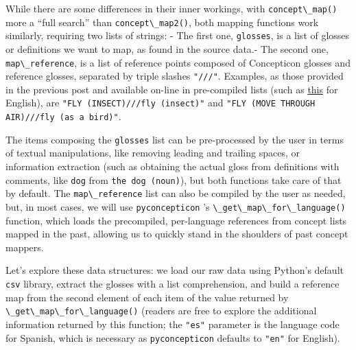 \documentclass[
  a4paper,
  14pt,
  oneside,
  tablecaptionabove
]{scrbook}
\newcommand{\passthrough}[1]{#1}
\begin{document}
While there are some differences in their inner workings, with
\passthrough{\lstinline!concept\_map()!} more a \enquote{full search}
than \passthrough{\lstinline!concept\_map2()!}, both mapping functions
work similarly, requiring two lists of strings: - The first one,
\passthrough{\lstinline!glosses!}, is a list of glosses or definitions
we want to map, as found in the source data.- The second one,
\passthrough{\lstinline!map\_reference!}, is a list of reference points
composed of Concepticon glosses and reference glosses, separated by
triple slashes \passthrough{\lstinline!"///"!}. Examples, as those
provided in the previous post and available on-line in pre-compiled
lists (such as
\href{https://github.com/concepticon/pyconcepticon/blob/master/tests/fixtures/mappings/map-en.tsv}{this}
for English), are
\passthrough{\lstinline!"FLY (INSECT)///fly (insect)"!} and
\passthrough{\lstinline!"FLY (MOVE THROUGH AIR)///fly (as a bird)"!}.

The items composing the \passthrough{\lstinline!glosses!} list can be
pre-processed by the user in terms of textual manipulations, like
removing leading and trailing spaces, or information extraction (such as
obtaining the actual gloss from definitions with comments, like
\passthrough{\lstinline!dog!} from
\passthrough{\lstinline!the dog (noun)!}), but both functions take care
of that by default. The \passthrough{\lstinline!map\_reference!} list
can also be compiled by the user as needed, but, in most cases, we will
use \passthrough{\lstinline!pyconcepticon!} 's
\passthrough{\lstinline!\_get\_map\_for\_language()!} function, which
loads the precompiled, per-language references from concept lists mapped
in the past, allowing us to quickly stand in the shoulders of past
concept mappers.

Let's explore these data structures: we load our raw data using Python's
default \passthrough{\lstinline!csv!} library, extract the glosses with
a list comprehension, and build a reference map from the second element
of each item of the value returned by
\passthrough{\lstinline!\_get\_map\_for\_language()!} (readers are free
to explore the additional information returned by this function; the
\passthrough{\lstinline!"es"!} parameter is the language code for
Spanish, which is necessary as \passthrough{\lstinline!pyconcepticon!}
defaults to \passthrough{\lstinline!"en"!} for English).
\end{document}
